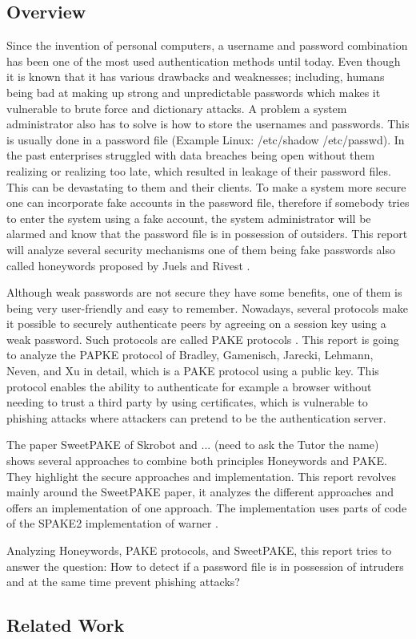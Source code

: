 \documentclass[../main.tex]{subfiles}
\begin{document}
\subsection{Overview}
Since the invention of personal computers, a username and password combination
has been one of the most used authentication methods until today. Even though
it is known that it has various drawbacks and weaknesses; including, humans
being bad at making up strong and unpredictable passwords which makes it
vulnerable to brute force and dictionary attacks. A problem a system
administrator also has to solve is how to store the usernames and passwords.
This is usually done in a password file (Example Linux: /etc/shadow
/etc/passwd). In the past enterprises struggled with data breaches being open
without them realizing or realizing too late, which resulted in leakage of their
password files. This can be devastating to them and their clients. To make a
system more secure one can incorporate fake accounts in the password file,
therefore if somebody tries to enter the system using a fake account, the
system administrator will be alarmed and know that the password file is in
possession of outsiders. This report will analyze several security mechanisms
one of them being fake passwords also called honeywords proposed by Juels and
Rivest \cite{juels2013honeywords}.  

Although weak passwords are not secure they have some benefits, one of them is
being very user-friendly and easy to remember. Nowadays, several protocols make
it possible to securely authenticate peers by agreeing on a session key using a
weak password. Such protocols are called PAKE protocols
\cite{bellovin1992encrypted} \cite{bellare2000authenticated}
\cite{boyko2000provably} \cite{canetti2005universally}. This report is going to
analyze the PAPKE protocol of Bradley, Gamenisch, Jarecki, Lehmann, Neven, and
Xu \cite{bradley2019password} in detail, which is a PAKE protocol using a
public key. This protocol enables the ability to authenticate for example a
browser without needing to trust a third party by using certificates, which is
vulnerable to phishing attacks where attackers can pretend to be the
authentication server.

The paper SweetPAKE of Skrobot and ... (need to ask the Tutor the name)
\cite{marjan2023} shows several approaches to combine both principles
Honeywords and PAKE. They highlight the secure approaches and implementation.
This report revolves mainly around the SweetPAKE paper, it analyzes the
different approaches and offers an implementation of one approach. The
implementation uses parts of code of the SPAKE2 implementation of warner \cite{Warner2016}.

Analyzing Honeywords, PAKE protocols, and SweetPAKE, this report tries to
answer the question: How to detect if a password file is in possession of
intruders and at the same time prevent phishing attacks? 

\subsection{Related Work}
\end{document}
